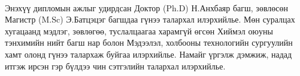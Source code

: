 
\begin{acknowledgements}
\addchaptertocentry{\acknowledgementname}
\paragraph{}Энэхүү дипломын ажлыг удирдсан Доктор (Ph.D) Н.Анхбаяр багш, зөвлөсөн Магистр (M.Sc) Э.Батцэцэг багшдаа гүнээ талархал илэрхийлье. Мөн суралцах хугацаанд мэдлэг, зөвлөгөө, туслалцаагаа харамгүй өгсөн Хиймэл оюуны тэнхимийн нийт багш нар болон Мэдээлэл, холбооны технологийн сургуулийн хамт олонд гүнээ талархаж буйгаа илэрхийлье. Намайг үргэлж дэмжиж, надад итгэж ирсэн гэр бүлдээ чин сэтгэлийн талархал илэрхийлье.
\end{acknowledgements}

